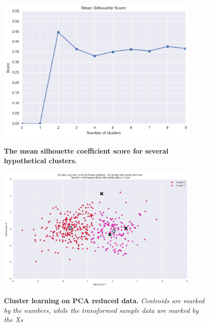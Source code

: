 \documentclass[twoside,openright,titlepage,numbers=noenddot,headinclude,%
               footinclude=true,cleardoublepage=empty,abstractoff,BCOR=5mm,%
               paper=a4,fontsize=11pt,ngerman,american]{scrreprt}
\numberwithin{theorem}{chapter}
\numberwithin{definition}{chapter}
\numberwithin{algorithm}{chapter}
\numberwithin{figure}{chapter}
\numberwithin{table}{chapter}
\numberwithin{equation}{chapter}
\begin{document}
\begin{figure}[!hbtp]
\centering
    
    \includegraphics[width=0.9\textwidth]{figures/meanSilhouetteScore}
    \label{meanSilhouetteScore}
    
    \caption{\textbf{The mean silhouette coefficient score for several hypothetical clusters.}}
\end{figure}


\begin{figure}[!hbtp]
\centering
    
    \includegraphics[width=0.9\textwidth]{figures/kMeansModelResults}
    \label{meanSilhouetteScore}
    
    \caption{\textbf{Cluster learning on PCA reduced data.} \textit{Centroids are marked by the numbers, while the transformed sample data are marked by the Xs}}
\end{figure}



\end{document}
